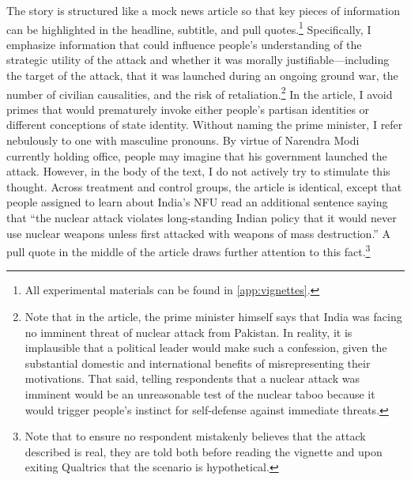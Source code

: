 \documentclass[12pt]{article}
\begin{document}
The story is structured like a mock news article so that key pieces of information can be highlighted in the headline, subtitle, and pull quotes.\footnote{All experimental materials can be found in  \autoref{app:vignettes}.} Specifically, I emphasize information that could influence people's understanding of the strategic utility of the attack and whether it was morally justifiable—including the target of the attack, that it was launched during an ongoing ground war, the number of civilian causalities, and the risk of retaliation.\footnote{Note that in the article, the prime minister himself says that India was facing no imminent threat of nuclear attack from Pakistan. In reality, it is implausible that a political leader would make such a confession, given the substantial domestic and international benefits of misrepresenting their motivations. That said, telling respondents that a nuclear attack was imminent would be an unreasonable test of the nuclear taboo because it would trigger people's instinct for self-defense against immediate threats.} In the article, I avoid primes that would prematurely invoke either people's partisan identities or different conceptions of state identity. Without naming the prime minister, I refer nebulously to one with masculine pronouns. By virtue of Narendra Modi currently holding office, people may imagine that his government launched the attack. However, in the body of the text, I do not actively try to stimulate this thought. Across treatment and control groups, the article is identical, except that people assigned to learn about India's NFU read an additional sentence saying that “the nuclear attack violates long-standing Indian policy that it would never use nuclear weapons unless first attacked with weapons of mass destruction.” A pull quote in the middle of the article draws further attention to this fact.\footnote{Note that to ensure no respondent mistakenly believes that the attack described is real, they are told both before reading the vignette and upon exiting Qualtrics that the scenario is hypothetical.}
\end{document}
